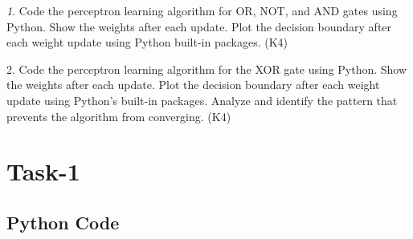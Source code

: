 \documentclass[11pt]{article}
\begin{document}
\textit1.  Code the perceptron learning algorithm for OR, NOT, and AND gates using Python. Show the weights after each update. Plot the decision boundary after each weight update using Python built-in packages. (K4)

2. Code the perceptron learning algorithm for the XOR gate using Python. Show the weights after each update. Plot the decision boundary after each weight update using Python's built-in packages. Analyze and identify the pattern that prevents the algorithm from converging. (K4)


\section{Task-1}

\subsection{Python Code}
\end{document}
